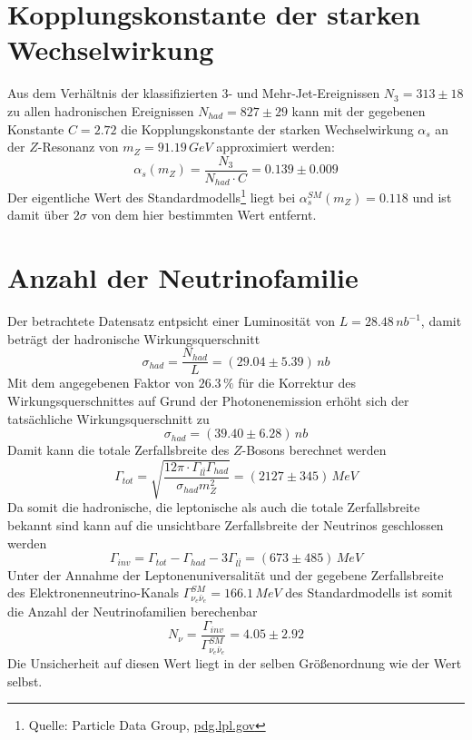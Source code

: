 \documentclass{include/thesisclass3}
\newcommand{\cc}{\cdot}
\newcommand{\e}[1]{\,\si{#1}}
\begin{document}
\section{Kopplungskonstante der starken Wechselwirkung}
Aus dem Verhältnis der klassifizierten $3$- und Mehr-Jet-Ereignissen $N_3 = 313 \pm 18$ zu allen hadronischen Ereignissen $N_{had} = 827 \pm 29$ kann mit der gegebenen Konstante $C = 2.72$ die Kopplungskonstante der starken Wechselwirkung $\alpha_s$ an der $Z$-Resonanz von $m_Z = 91.19\e{GeV}$ approximiert werden:
\[ \alpha_s(m_Z) = \frac{ N_3}{N_{had} \cc C} = 0.139\pm 0.009 \]
Der eigentliche Wert des Standardmodells\footnote{Quelle: Particle Data Group, \url{pdg.lpl.gov}} liegt bei $\alpha_s^{SM}(m_Z) = 0.118$ und ist damit über $2\sigma$ von dem hier bestimmten Wert entfernt.

\section{Anzahl der Neutrinofamilie}
Der betrachtete Datensatz entpsicht einer Luminosität von $L = 28.48\e{nb^{-1}}$, damit beträgt der hadronische Wirkungsquerschnitt
\[\sigma_{had} = \frac{ N_{had}}{L} = (29.04 \pm 5.39)\e{nb}\]
Mit dem angegebenen Faktor von $26.3\e{\%}$ für die Korrektur des Wirkungsquerschnittes auf Grund der Photonenemission erhöht sich der tatsächliche Wirkungsquerschnitt zu
\[\sigma_{had} = (39.40 \pm 6.28)\e{nb}\]
Damit kann die totale Zerfallsbreite des $Z$-Bosons berechnet werden
\[\Gamma_{tot} = \sqrt{ \frac{ 12 \pi \cc \Gamma_{l \bar l} \Gamma_{had}}{\sigma_{had} m_Z^2}} = (2127 \pm 345)\e{MeV}\]
Da somit die hadronische, die leptonische als auch die totale Zerfallsbreite bekannt sind kann auf die unsichtbare Zerfallsbreite der Neutrinos geschlossen werden
\[\Gamma_{inv} = \Gamma_{tot} - \Gamma_{had} - 3 \Gamma_{l\bar l} = (673\pm 485)\e{MeV}\]
Unter der Annahme der Leptonenuniversalität und der gegebene Zerfallsbreite des Elektronenneutrino-Kanals $\Gamma^{SM}_{\nu_e \bar \nu_e}=166.1\e{MeV}$ des Standardmodells ist somit die Anzahl der Neutrinofamilien berechenbar
\[N_\nu = \frac{\Gamma_{inv}}{\Gamma_{\nu_e \bar \nu_e}^{SM}} = 4.05\pm 2.92\]
Die Unsicherheit auf diesen Wert liegt in der selben Größenordnung wie der Wert selbst.
\end{document}
